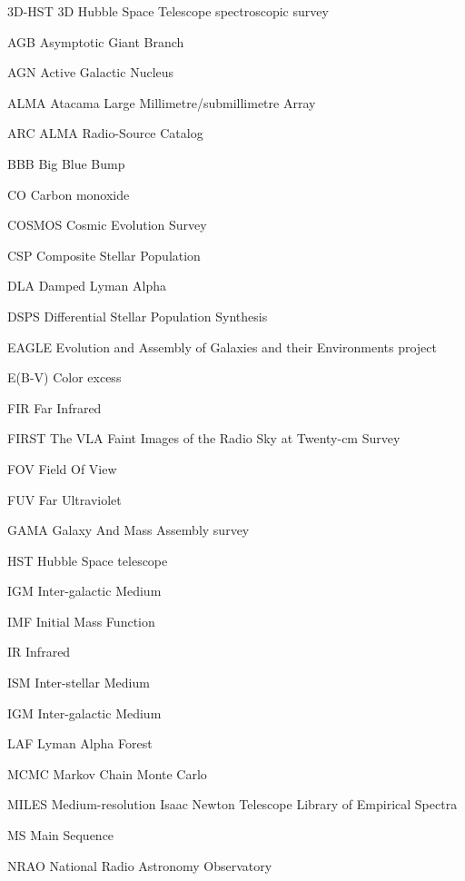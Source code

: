 \begin{abbreviations}
    \item[3D-HST]{3D Hubble Space Telescope spectroscopic survey}
    \item[AGB] { Asymptotic Giant Branch}
    \item[AGN] { Active Galactic Nucleus}
    \item[ALMA] { Atacama Large Millimetre/submillimetre Array}
    \item[ARC] { ALMA Radio-Source Catalog}
    \item[BBB] { Big Blue Bump}
    \item[CO] {Carbon monoxide}
    \item[COSMOS] {Cosmic Evolution Survey}
    \item[CSP] {Composite Stellar Population}
    \item[DLA] {Damped Lyman Alpha}
    \item[DSPS] {Differential Stellar Population Synthesis}
    \item[EAGLE] {Evolution and Assembly of Galaxies and their Environments project}
    \item[E(B-V)] {Color excess}  
    \item[FIR] {Far Infrared}
    \item[FIRST] {The VLA Faint Images of the Radio Sky at Twenty-cm Survey}
    \item[FOV] {Field Of View}
    \item[FUV] {Far Ultraviolet }
    \item[GAMA] {Galaxy And Mass Assembly survey}
    \item[HST] {Hubble Space telescope}
    \item[IGM] { Inter-galactic Medium}
    \item[IMF] { Initial Mass Function}
    \item[IR] {Infrared }
    \item[ISM] { Inter-stellar Medium}
    \item[IGM] { Inter-galactic Medium}
    \item[LAF] {Lyman Alpha Forest}
    \item[MCMC] {Markov Chain Monte Carlo}
    \item[MILES] {Medium-resolution Isaac Newton Telescope Library of Empirical Spectra}
    \item[MS] {Main Sequence}
    \item[NRAO] {National Radio Astronomy Observatory}

\end{abbreviations}
